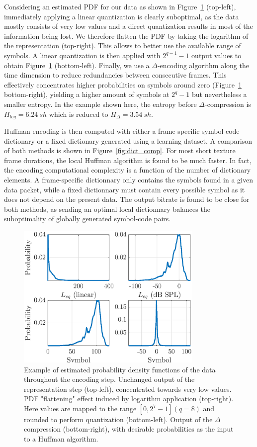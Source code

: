 \documentclass[sensors,article,submit,moreauthors,pdftex,10pt,a4paper]{mdpi}
\begin{document}
Considering an estimated PDF for our data as shown in Figure~\ref{fig:pdf} (top-left), immediately applying a linear quantization is clearly suboptimal, as the data mostly consists of very low values and a direct quantization results in most of the information being lost. We therefore flatten the PDF by taking the logarithm of the representation (top-right). This allows to better use the available range of symbols. A linear quantization is then applied with $2^{q-1}-1$ output values to obtain Figure~\ref{fig:pdf} (bottom-left). Finally, we use a $\Delta$-encoding algorithm along the time dimension to reduce redundancies between consecutive frames. This effectively concentrates higher probabilities on symbols around zero (Figure~\ref{fig:pdf} bottom-right), yielding a higher amount of symbols at $2^q-1$ but nevertheless a smaller entropy. In the example shown here, the entropy before $\Delta$-compression is $H_{log} = 6.24~sh$ which is reduced to $H_{\Delta} = 3.54~sh$.

Huffman encoding is then computed with either a frame-specific symbol-code dictionary or a fixed dictionary generated using a learning dataset. A comparison of both methods is shown in Figure~\ref{fig:dict_comp}. For most short texture frame durations, the local Huffman algorithm is found to be much faster. In fact, the encoding computational complexity is a function of the number of dictionary elements. A frame-specific dictionnary only contains the symbols found in a given data packet, while a fixed dictionnary must contain every possible symbol as it does not depend on the present data. The output bitrate is found to be close for both methods, as sending an optimal local dictionnary balances the suboptimality of globally generated symbol-code pairs.\\

\begin{figure}[htbp]
	\centering
		\includegraphics[width=0.8\textwidth]{figures/pdf.eps}
	\caption{Example of estimated probability density functions of the data throughout the encoding step. Unchanged output of the representation step (top-left), concentrated towards very low values. PDF "flattening" effect induced by logarithm application (top-right). Here values are mapped to the range $[0, 2^7-1] (q=8)$ and rounded to perform quantization (bottom-left). Output of the $\Delta$ compression (bottom-right), with desirable probabilities as the input to a Huffman algorithm.}
	\label{fig:pdf}
\end{figure}
\end{document}
